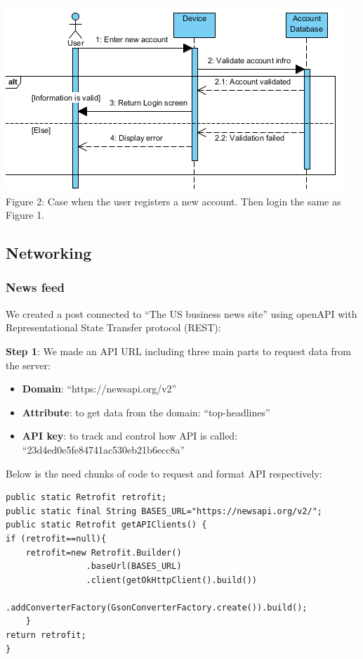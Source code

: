 \begin{center}
    \includegraphics{Image/sequence_diagram_2.png}
    \\
    \caption{Figure 2: Case when the user registers a new account. Then login the same as Figure 1.}
\end{center}

\subsection{Networking}
\subsubsection{News feed}
\hspace{0.7cm}We created a post connected to “The US business news site” using openAPI with Representational State Transfer protocol (REST):

\vspace{0.5cm}\textbf{Step 1}: We made an API URL including three main parts to request data from the server:
\begin{itemize}
    \item \textbf{Domain}: “https://newsapi.org/v2”
    \item \textbf{Attribute}: to get data from the domain: “top-headlines”
    \item \textbf{API key}: to track and control how API is called: “23d4ed0e5fe84741ac530eb21b6ecc8a”
\end{itemize}
\hspace{0.7cm}Below is the need chunks of code to request and format API respectively:

\begin{verbatim}
public static Retrofit retrofit;
public static final String BASES_URL="https://newsapi.org/v2/";
public static Retrofit getAPIClients() {
if (retrofit==null){
    retrofit=new Retrofit.Builder()
                .baseUrl(BASES_URL)
                .client(getOkHttpClient().build())
                .addConverterFactory(GsonConverterFactory.create()).build();
    }
return retrofit;
}
\end{verbatim}

